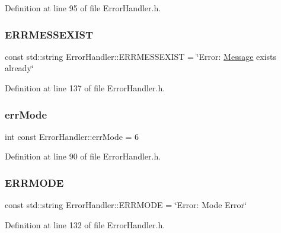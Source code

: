Definition at line 95 of file Error\+Handler.\+h.

\mbox{\label{classErrorHandler_a8abcac399b5014dad5f8d728298489e3}} 
\subsubsection{\texorpdfstring{ERRMESSEXIST}{ERRMESSEXIST}}
{\footnotesize\ttfamily const std\+::string Error\+Handler\+::\+E\+R\+R\+M\+E\+S\+S\+E\+X\+I\+ST = \char`\"{}Error\+: \mbox{\hyperlink{classMessage}{Message}} exists already\char`\"{}\hspace{0.3cm}{\ttfamily [static]}}



Definition at line 137 of file Error\+Handler.\+h.

\mbox{\label{classErrorHandler_a1ec0cf275df16d2fe2641cc29c0f2ff0}} 
\subsubsection{\texorpdfstring{errMode}{errMode}}
{\footnotesize\ttfamily int const Error\+Handler\+::err\+Mode = 6\hspace{0.3cm}{\ttfamily [static]}}



Definition at line 90 of file Error\+Handler.\+h.

\mbox{\label{classErrorHandler_a88183b288608b1f8c54c84a27d5f6a40}} 
\subsubsection{\texorpdfstring{ERRMODE}{ERRMODE}}
{\footnotesize\ttfamily const std\+::string Error\+Handler\+::\+E\+R\+R\+M\+O\+DE = \char`\"{}Error\+: Mode Error\char`\"{}\hspace{0.3cm}{\ttfamily [static]}}



Definition at line 132 of file Error\+Handler.\+h.

\mbox{\label{classErrorHandler_aeb08094d2754a72bdaf44a80c77d4189}} 
